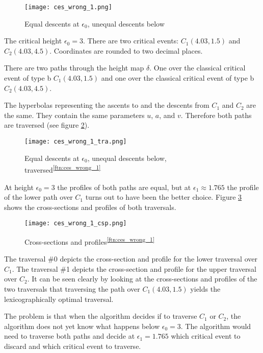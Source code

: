 \begin{figure}[H]
	\centering
    
    \texttt{[image: ces\_wrong\_1.png]}
		
	\caption{Equal descents at $\epsilon_0$, unequal descents below\protect\footnotemark}
    \label{fig:ces_wrong_1}
\end{figure}

The critical height $\epsilon_0 = 3$. There are two critical events: $C_1(4.03, 1.5)$ and $C_2(4.03, 4.5)$. Coordinates are rounded to two decimal places.

There are two paths through the height map $\delta$. One over the classical critical event of type b $C_1(4.03, 1.5)$ and one over the classical critical event of type b $C_2(4.03, 4.5)$.

The hyperbolas representing the ascents to and the descents from $C_1$ and $C_2$ are the same. They contain the same parameters $u$, $a$, and $v$. Therefore both paths are traversed (see figure \ref{fig:ces_wrong_1_tra}).

\begin{figure}[H]
	\centering
    
    \texttt{[image: ces\_wrong\_1\_tra.png]}
		
	\caption{Equal descents at $\epsilon_0$, unequal descents below, traversed\textsuperscript{\ref{ftn:ces_wrong_1}}}
    \label{fig:ces_wrong_1_tra}
\end{figure}

At height $\epsilon_0 = 3$ the profiles of both paths are equal, but at $\epsilon_1 \approx 1.765$ the profile of the lower path over $C_1$ turns out to have been the better choice. Figure \ref{fig:ces_wrong_1_csp} shows the cross-sections and profiles of both traversals.

\begin{figure}[H]
	\centering
    
    \texttt{[image: ces\_wrong\_1\_csp.png]}
		
	\caption{Cross-sections and profiles\textsuperscript{\ref{ftn:ces_wrong_1}}}
    \label{fig:ces_wrong_1_csp}
\end{figure}

The traversal \#0 depicts the cross-section and profile for the lower traversal over $C_1$. The traversal \#1 depicts the cross-section and profile for the upper traversal over $C_2$. It can be seen clearly by looking at the cross-sections and profiles of the two traversals that traversing the path over $C_1(4.03, 1.5)$ yields the lexicographically optimal traversal.

The problem is that when the algorithm decides if to traverse $C_1$ or $C_2$, the algorithm does not yet know what happens below $\epsilon_0 = 3$. The algorithm would need to traverse both paths and decide at $\epsilon_1 = 1.765$ which critical event to discard and which critical event to traverse.




